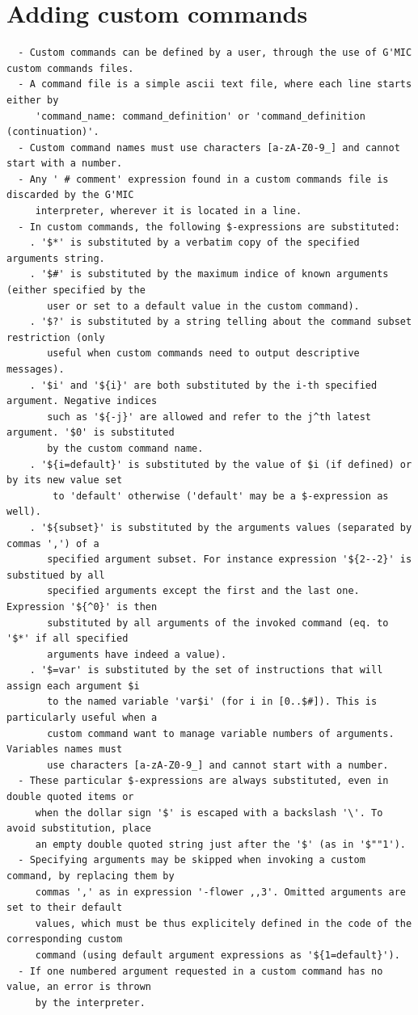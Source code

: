 \documentclass[a4paper,11pt,twoside]{book}
\begin{document}
\section{Adding custom commands}
\small
\begin{lstlisting}
  - Custom commands can be defined by a user, through the use of G'MIC custom commands files. 
  - A command file is a simple ascii text file, where each line starts either by 
     'command_name: command_definition' or 'command_definition (continuation)'. 
  - Custom command names must use characters [a-zA-Z0-9_] and cannot start with a number. 
  - Any ' # comment' expression found in a custom commands file is discarded by the G'MIC 
     interpreter, wherever it is located in a line. 
  - In custom commands, the following $-expressions are substituted: 
    . '$*' is substituted by a verbatim copy of the specified arguments string. 
    . '$#' is substituted by the maximum indice of known arguments (either specified by the 
       user or set to a default value in the custom command). 
    . '$?' is substituted by a string telling about the command subset restriction (only 
       useful when custom commands need to output descriptive messages). 
    . '$i' and '${i}' are both substituted by the i-th specified argument. Negative indices 
       such as '${-j}' are allowed and refer to the j^th latest argument. '$0' is substituted 
       by the custom command name. 
    . '${i=default}' is substituted by the value of $i (if defined) or by its new value set 
        to 'default' otherwise ('default' may be a $-expression as well). 
    . '${subset}' is substituted by the arguments values (separated by commas ',') of a 
       specified argument subset. For instance expression '${2--2}' is substitued by all 
       specified arguments except the first and the last one. Expression '${^0}' is then 
       substituted by all arguments of the invoked command (eq. to '$*' if all specified 
       arguments have indeed a value). 
    . '$=var' is substituted by the set of instructions that will assign each argument $i 
       to the named variable 'var$i' (for i in [0..$#]). This is particularly useful when a 
       custom command want to manage variable numbers of arguments. Variables names must 
       use characters [a-zA-Z0-9_] and cannot start with a number. 
  - These particular $-expressions are always substituted, even in double quoted items or 
     when the dollar sign '$' is escaped with a backslash '\'. To avoid substitution, place 
     an empty double quoted string just after the '$' (as in '$""1'). 
  - Specifying arguments may be skipped when invoking a custom command, by replacing them by 
     commas ',' as in expression '-flower ,,3'. Omitted arguments are set to their default 
     values, which must be thus explicitely defined in the code of the corresponding custom 
     command (using default argument expressions as '${1=default}'). 
  - If one numbered argument requested in a custom command has no value, an error is thrown 
     by the interpreter.
\end{lstlisting}
\normalsize
\end{document}
